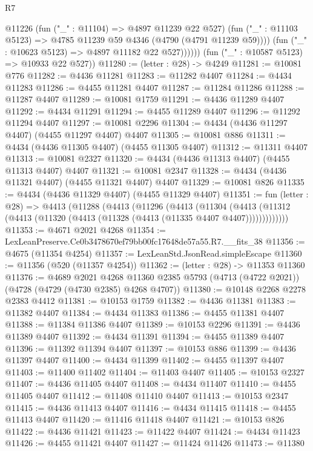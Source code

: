 \begin{lexlean}{R7}
\begin{coremodule}
                @11226
                  (fun ("_" : @11104) => @4897 @11239 @22 @527)
                  (fun ("_" : @11103 @5123) => @4785 @11239 @59 @4346 (@4790 (@4791 @11239 @59))))
                (fun ("_" : @10623 @5123) => @4897 @11182 @22 @527))))))
      (fun ("_" : @10587 @5123) => @10933 @22 @527))
@11280 := (letter : @28) -> @4249
@11281 := @10081 @776
@11282 := @4436 @11281
@11283 := @11282 @4407
@11284 := @4434 @11283
@11286 := @4455 @11281 @4407
@11287 := @11284 @11286
@11288 := @11287 @4407
@11289 := @10081 @1759
@11291 := @4436 @11289 @4407
@11292 := @4434 @11291
@11294 := @4455 @11289 @4407
@11296 := @11292 @11294 @4407
@11297 := @10081 @2296
@11304 := @4434 (@4436 @11297 @4407) (@4455 @11297 @4407) @4407
@11305 := @10081 @886
@11311 := @4434 (@4436 @11305 @4407) (@4455 @11305 @4407)
@11312 := @11311 @4407
@11313 := @10081 @2327
@11320 := @4434 (@4436 @11313 @4407) (@4455 @11313 @4407) @4407
@11321 := @10081 @2347
@11328 := @4434 (@4436 @11321 @4407) (@4455 @11321 @4407) @4407
@11329 := @10081 @826
@11335 := @4434 (@4436 @11329 @4407) (@4455 @11329 @4407)
@11351 := fun (letter : @28) =>
  @4413
    (@11288
      (@4413
        (@11296
          (@4413
            (@11304
              (@4413 (@11312 (@4413 (@11320 (@4413 (@11328 (@4413 (@11335 @4407 @4407)))))))))))))
@11353 := @4671 @2021 @4268
@11354 := LexLeanPreserve.Ce0b3478670ef79bb00fc17648de57a55.R7.__fits_38
@11356 := @4675 (@11354 @4254)
@11357 := LexLeanStd.JsonRead.simpleEscape
@11360 := @11356 (@520 (@11357 @4254))
@11362 := (letter : @28) -> @11353 @11360
@11376 := @4689
    @2021
    @4268
    @11360
    @2385
    @5793
    (@4713 (@4722 @2021))
    (@4728 (@4729 (@4730 @2385) @4268 @4707))
@11380 := @10148 @2268 @2278 @2383 @4412
@11381 := @10153 @1759
@11382 := @4436 @11381
@11383 := @11382 @4407
@11384 := @4434 @11383
@11386 := @4455 @11381 @4407
@11388 := @11384 @11386 @4407
@11389 := @10153 @2296
@11391 := @4436 @11389 @4407
@11392 := @4434 @11391
@11394 := @4455 @11389 @4407
@11396 := @11392 @11394 @4407
@11397 := @10153 @886
@11399 := @4436 @11397 @4407
@11400 := @4434 @11399
@11402 := @4455 @11397 @4407
@11403 := @11400 @11402
@11404 := @11403 @4407
@11405 := @10153 @2327
@11407 := @4436 @11405 @4407
@11408 := @4434 @11407
@11410 := @4455 @11405 @4407
@11412 := @11408 @11410 @4407
@11413 := @10153 @2347
@11415 := @4436 @11413 @4407
@11416 := @4434 @11415
@11418 := @4455 @11413 @4407
@11420 := @11416 @11418 @4407
@11421 := @10153 @826
@11422 := @4436 @11421
@11423 := @11422 @4407
@11424 := @4434 @11423
@11426 := @4455 @11421 @4407
@11427 := @11424 @11426
@11473 := @11380

\end{coremodule}
\end{lexlean}
